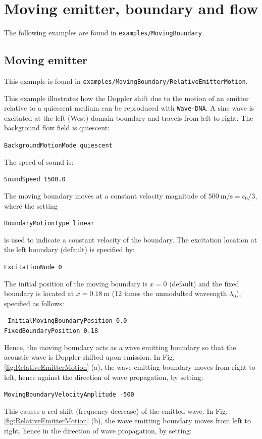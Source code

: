 \section{Moving emitter, boundary and flow}
\label{sec:Moving emitter, boundary and flow}

The following examples are found in {\tt examples/MovingBoundary}.

\subsection{Moving emitter}
\label{sec:Moving emitter}

This example is found in {\tt examples/MovingBoundary/RelativeEmitterMotion}.

This example illustrates how the Doppler shift due to the motion of an emitter relative to a quiescent medium can be reproduced with {\tt Wave-DNA}. A sine wave is excitated at the left (West) domain boundary and travels from left to right. The background flow field is quiescent:

{\tt BackgroundMotionMode quiescent}

The speed of sound is:

{\tt SoundSpeed 1500.0}

The moving boundary moves at a constant velocity magnitude of $500\:\mathrm{m/s}=c_0/3$, where the setting

{\tt BoundaryMotionType linear}

is used to indicate a constant velocity of the boundary. The excitation location at the left boundary (default) is specified by:

{\tt ExcitationNode 0}

The initial position of the moving boundary is $x=0$ (default) and the fixed boundary is located at $x=0.18\:\mathrm{m}$ (12 times the unmodulted waveength $\lambda_0$), specified as follows:

{\tt
InitialMovingBoundaryPosition 0.0 \\
FixedBoundaryPosition 0.18
}

Hence, the moving boundary acts as a wave emitting boundary so that the acoustic wave is Doppler-shifted upon emission. In Fig. \ref{fig:RelativeEmitterMotion} (a), the wave emitting boundary moves from right to left, hence against the direction of wave propagation, by setting:

{\tt MovingBoundaryVelocityAmplitude -500}

This causes a red-shift (frequency decrease) of the emitted wave. In Fig. \ref{fig:RelativeEmitterMotion} (b), the wave emitting boundary moves from left to right, hence in the direction of wave propagation, by setting:

